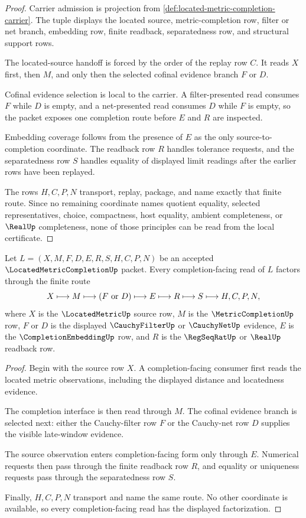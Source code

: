 \begin{proof}
Carrier admission is projection from \autoref{def:located-metric-completion-carrier}. The tuple displays the located source, metric-completion row, filter or net branch, embedding row, finite readback, separatedness row, and structural support rows.

The located-source handoff is forced by the order of the replay row $C$. It reads $X$ first, then $M$, and only then the selected cofinal evidence branch $F$ or $D$.

Cofinal evidence selection is local to the carrier. A filter-presented read consumes $F$ while $D$ is empty, and a net-presented read consumes $D$ while $F$ is empty, so the packet exposes one completion route before $E$ and $R$ are inspected.

Embedding coverage follows from the presence of $E$ as the only source-to-completion coordinate. The readback row $R$ handles tolerance requests, and the separatedness row $S$ handles equality of displayed limit readings after the earlier rows have been replayed.

The rows $H,C,P,N$ transport, replay, package, and name exactly that finite route. Since no remaining coordinate names quotient equality, selected representatives, choice, compactness, host equality, ambient completeness, or $\RealUp$ completeness, none of those principles can be read from the local certificate.
\end{proof}

\begin{theorem}
\label{thm:located-metric-completion-source-handoff}
Let $L=(X,M,F,D,E,R,S,H,C,P,N)$ be an accepted $\LocatedMetricCompletionUp$ packet. Every completion-facing read of $L$ factors through the finite route
$$
X\longmapsto M\longmapsto (F\ \hbox{or}\ D)\longmapsto E\longmapsto R\longmapsto S\longmapsto H,C,P,N ,
$$
where $X$ is the $\LocatedMetricUp$ source row, $M$ is the $\MetricCompletionUp$ row, $F$ or $D$ is the displayed $\CauchyFilterUp$ or $\CauchyNetUp$ evidence, $E$ is the $\CompletionEmbeddingUp$ row, and $R$ is the $\RegSeqRatUp$ or $\RealUp$ readback row.
\end{theorem}
\begin{proof}
Begin with the source row $X$. A completion-facing consumer first reads the located metric observations, including the displayed distance and locatedness evidence.

The completion interface is then read through $M$. The cofinal evidence branch is selected next: either the Cauchy-filter row $F$ or the Cauchy-net row $D$ supplies the visible late-window evidence.

The source observation enters completion-facing form only through $E$. Numerical requests then pass through the finite readback row $R$, and equality or uniqueness requests pass through the separatedness row $S$.

Finally, $H,C,P,N$ transport and name the same route. No other coordinate is available, so every completion-facing read has the displayed factorization.
\end{proof}

